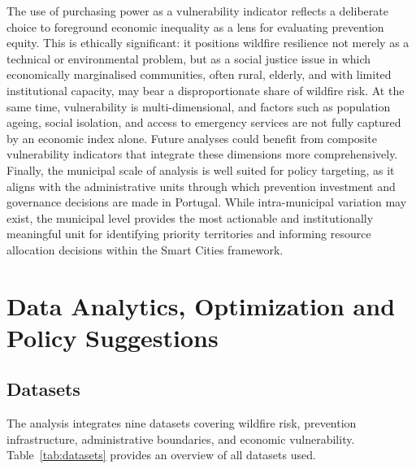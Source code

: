 The use of purchasing power as a vulnerability indicator reflects a deliberate
choice to foreground economic inequality as a lens for evaluating prevention
equity. This is ethically significant: it positions wildfire resilience not
merely as a technical or environmental problem, but as a social justice issue
in which economically marginalised communities, often rural, elderly, and
with limited institutional capacity, may bear a disproportionate share of
wildfire risk. At the same time, vulnerability is
multi-dimensional, and factors such as population ageing, social isolation,
and access to emergency services are not fully captured by an economic index
alone. Future analyses could benefit from composite vulnerability indicators
that integrate these dimensions more comprehensively.\\

Finally, the municipal scale of analysis is well suited for policy targeting,
as it aligns with the administrative units through which prevention investment
and governance decisions are made in Portugal. While intra-municipal variation
may exist, the municipal level provides the most actionable and institutionally
meaningful unit for identifying priority territories and informing resource
allocation decisions within the Smart Cities framework.

\newpage






\section{Data Analytics, Optimization and Policy Suggestions}


\subsection{Datasets}



The analysis integrates nine datasets covering wildfire risk, prevention
infrastructure, administrative boundaries, and economic vulnerability.
Table~\ref{tab:datasets} provides an overview of all datasets used.\\

